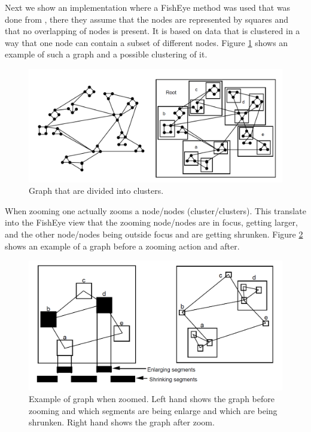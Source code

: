 \documentclass[a4paper,11pt]{kth-mag}
\begin{document}
Next we show an implementation where a FishEye method was used that was done from \cite{Schaffer:1996:NHC:230562.230577}, there they assume that the nodes are represented by squares and that no 
overlapping of nodes is present. It is based on data that is clustered in a way that one node can contain a subset of different nodes. Figure \ref{fig:FishEyeCluster} shows an example of such a graph and a 
possible clustering of it.

\begin{figure}[!htbp]
	\centering
	\includegraphics[scale=0.3]{FishEyeCluster}
	\caption{Graph that are divided into clusters.}
	\label{fig:FishEyeCluster}
\end{figure}

When zooming one actually zooms a node/nodes (cluster/clusters). This translate into the FishEye view that the zooming node/nodes are in focus, getting larger, and the
other node/nodes being outside focus and are getting shrunken. Figure \ref{fig:FishEyeZoom} shows an example of a graph before a zooming action and after.

\begin{figure}[!htbp]
	\centering
	\includegraphics[scale=0.3]{FishEyeZoom}
	\caption{Example of graph when zoomed. Left hand shows the graph before zooming and which segments are being enlarge and which are being shrunken. Right hand shows the graph after zoom.}
	\label{fig:FishEyeZoom}
\end{figure}
\newpage
\end{document}
